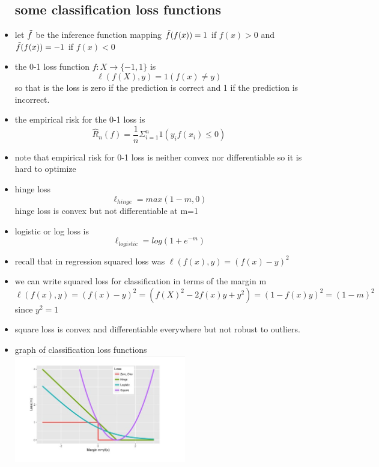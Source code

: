 \documentclass{article}
\begin{document}
\begin{itemize}
\subsection{some classification loss functions}
\item let $\Tilde{f}$ be the inference function mapping $\Tilde{f}(f(x))=1$ if $f(x)>0$ and $\Tilde{f}(f(x))=-1$ if $f(x)<0$
\item the 0-1 loss function $f:X\rightarrow\{-1,1\}$ is $$\ell(f(X),y)=1(f(x)\neq y)$$ so that is the loss is zero if the prediction is correct and 1 if the prediction is incorrect.
\item the empirical risk for the 0-1 loss is $$\hat{R}_{n}(f)=\frac{1}{n}\Sigma_{i=1}^{n}1(y_if(x_i)\leq 0)$$
\item note that empirical risk for 0-1 loss is neither convex nor differentiable so it is hard to optimize
\item hinge loss $$\ell_{hinge}=max(1-m,0)$$ hinge loss is convex but not differentiable at m=1
\item logistic or log loss is $$\ell_{logistic}=log(1+e^{-m})$$
\item recall that in regression squared loss was $\ell(f(x),y)=(f(x)-y)^2$
\item we can write squared loss for classification in terms of the margin m $$\ell(f(x),y)=(f(x)-y)^2=(f(X)^2-2f(x)y+y^2)=(1-f(x)y)^2=(1-m)^2$$ since $y^2=1$
\item square loss is convex and differentiable everywhere but not robust to outliers.
\item graph of classification loss functions \\ \includegraphics[width=7.5cm]{lecture_notes/lecture_2/immages/g_d_7.jpg}
\end{itemize}
\end{document}
